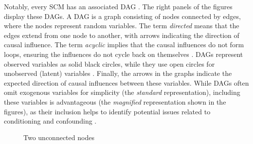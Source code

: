 \documentclass[
  authoryear,
  review,
  1p]{elsarticle}
\begin{document}
Notably, every SCM has an associated DAG
\citep{Pearl_et_al_2016, Cinelli_et_al_2020}. The right panels of the
figures display these DAGs. A DAG is a graph consisting of nodes
connected by edges, where the nodes represent random variables. The term
\emph{directed} means that the edges extend from one node to another,
with arrows indicating the direction of causal influence. The term
\emph{acyclic} implies that the causal influences do not form loops,
ensuring the influences do not cycle back on themselves
\citep{McElreath_2020}. DAGs represent observed variables as solid black
circles, while they use open circles for unobserved (latent) variables
\citep{Morgan_et_al_2014}. Finally, the arrows in the graphs indicate
the expected direction of causal influences between these variables.
While DAGs often omit exogenous variables for simplicity (the
\emph{standard} representation), including these variables is
advantageous (the \emph{magnified} representation shown in the figures),
as their inclusion helps to identify potential issues related to
conditioning and confounding \citep{Cinelli_et_al_2020}.

\begin{figure}[H]

\begin{minipage}{0.50\linewidth}

\centering{

\[
\begin{aligned}
  X_{1} & := f_{X1}(e_{X1}) \\
  X_{3} & := f_{X3}(e_{X3}) \\
  e_{X1} & \perp\!\!\!\perp e_{X3}
\end{aligned}
\]

}


\end{minipage}%
%
\begin{minipage}{0.50\linewidth}



\end{minipage}%

\caption{\label{fig-dags_scms1}Two unconnected nodes}

\end{figure}%
\end{document}
